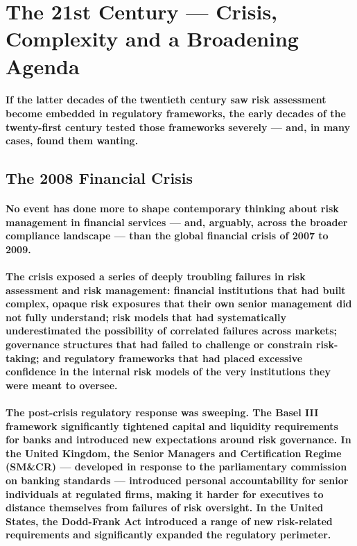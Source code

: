 \section{The 21st Century — Crisis, Complexity and a Broadening Agenda}

\paragraph{If the latter decades of the twentieth century saw risk assessment become embedded in regulatory frameworks, the early decades of the twenty-first century tested those frameworks severely — and, in many cases, found them wanting.}

\subsection{The 2008 Financial Crisis}
\paragraph{No event has done more to shape contemporary thinking about risk management in financial services — and, arguably, across the broader compliance landscape — than the global financial crisis of 2007 to 2009.}
\paragraph{The crisis exposed a series of deeply troubling failures in risk assessment and risk management: financial institutions that had built complex, opaque risk exposures that their own senior management did not fully understand; risk models that had systematically underestimated the possibility of correlated failures across markets; governance structures that had failed to challenge or constrain risk-taking; and regulatory frameworks that had placed excessive confidence in the internal risk models of the very institutions they were meant to oversee.}
\paragraph{The post-crisis regulatory response was sweeping. The \textbf{Basel III framework} significantly tightened capital and liquidity requirements for banks and introduced new expectations around risk governance. In the United Kingdom, the \textbf{Senior Managers and Certification Regime (SM\&CR)} — developed in response to the parliamentary commission on banking standards — introduced personal accountability for senior individuals at regulated firms, making it harder for executives to distance themselves from failures of risk oversight. In the United States, the \textbf{Dodd-Frank Act} introduced a range of new risk-related requirements and significantly expanded the regulatory perimeter.}
